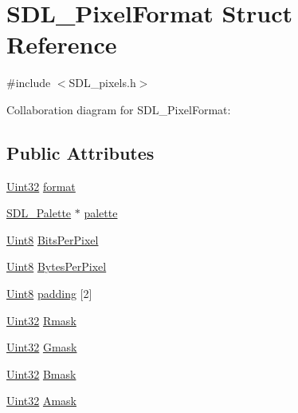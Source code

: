 \hypertarget{struct_s_d_l___pixel_format}{\section{S\-D\-L\-\_\-\-Pixel\-Format Struct Reference}
\label{struct_s_d_l___pixel_format}
}


{\ttfamily \#include $<$S\-D\-L\-\_\-pixels.\-h$>$}



Collaboration diagram for S\-D\-L\-\_\-\-Pixel\-Format\-:
\subsection*{Public Attributes}
\begin{DoxyCompactItemize}
\item 
\hyperlink{_s_d_l__stdinc_8h_add440eff171ea5f55cb00c4a9ab8672d}{Uint32} \hyperlink{struct_s_d_l___pixel_format_a44045e1da843f3d1fad3a608e16af712}{format}
\item 
\hyperlink{struct_s_d_l___palette}{S\-D\-L\-\_\-\-Palette} $\ast$ \hyperlink{struct_s_d_l___pixel_format_aeae611aba76f5eb11b696807926c5116}{palette}
\item 
\hyperlink{_s_d_l__stdinc_8h_a2944638813a090aa23e62f4da842c3e2}{Uint8} \hyperlink{struct_s_d_l___pixel_format_aac533fae3043ef44df01108248e111d8}{Bits\-Per\-Pixel}
\item 
\hyperlink{_s_d_l__stdinc_8h_a2944638813a090aa23e62f4da842c3e2}{Uint8} \hyperlink{struct_s_d_l___pixel_format_a6fec9e1809cc3da458d58b8cccd058f2}{Bytes\-Per\-Pixel}
\item 
\hyperlink{_s_d_l__stdinc_8h_a2944638813a090aa23e62f4da842c3e2}{Uint8} \hyperlink{struct_s_d_l___pixel_format_a1f4e276fbda82e60eaff28f61c7cd19e}{padding} \mbox{[}2\mbox{]}
\item 
\hyperlink{_s_d_l__stdinc_8h_add440eff171ea5f55cb00c4a9ab8672d}{Uint32} \hyperlink{struct_s_d_l___pixel_format_a35e5793f6e9c356aec2d130167174946}{Rmask}
\item 
\hyperlink{_s_d_l__stdinc_8h_add440eff171ea5f55cb00c4a9ab8672d}{Uint32} \hyperlink{struct_s_d_l___pixel_format_a3d07a81b430202c6ea0089d8df8f4e15}{Gmask}
\item 
\hyperlink{_s_d_l__stdinc_8h_add440eff171ea5f55cb00c4a9ab8672d}{Uint32} \hyperlink{struct_s_d_l___pixel_format_ad366812df3ae62edb9ae6cb89234fddb}{Bmask}
\item 
\hyperlink{_s_d_l__stdinc_8h_add440eff171ea5f55cb00c4a9ab8672d}{Uint32} \hyperlink{struct_s_d_l___pixel_format_a6cdaf31f6cb153fefda47fa6b8368c0e}{Amask}

\end{DoxyCompactItemize}
